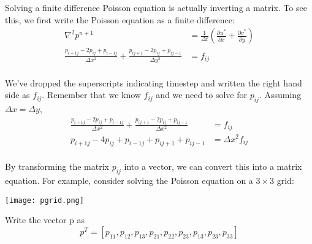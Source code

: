 \documentclass[12pt]{article}
\begin{document}
Solving a finite difference Poisson equation is actually inverting a matrix.  To see this, we first write the Poisson equation as a finite difference:
\begin{align*}
\nabla^2 p^{n+1} &= \frac{1}{\Delta t}\left( \frac{\partial u^*}{\partial x} + \frac{\partial v^*}{\partial y}\right) \\
\frac{p_{i+1j}-2p_{ij}+p_{i-1j}}{\Delta x^2} + \frac{p_{ij+1}-2p_{ij}+p_{ij-1}}{\Delta y^2} &= f_{ij}  \\
\end{align*}

We've dropped the superscripts indicating timestep and written the right hand side as $f_{ij}$.  Remember that we know $f_{ij}$ and we need to solve for $p_{ij}$.  Assuming $\Delta x = \Delta y$,
\begin{align*}
\frac{p_{i+1j}-2p_{ij}+p_{i-1j}}{\Delta x^2} + \frac{p_{ij+1}-2p_{ij}+p_{ij-1}}{\Delta x^2} &= f_{ij}  \\
p_{i+1j}-4p_{ij}+p_{i-1j}+ p_{ij+1}+p_{ij-1} &= \Delta x^2 f_{ij}  \\
\end{align*}

By transforming the matrix $p_{ij}$ into a vector, we can convert this into a matrix equation.  For example, consider solving the Poisson equation on a $3 \times 3$ grid:
\begin{center}
\texttt{[image: pgrid.png]} 
\end{center}

Write the vector p as
\[ p^{T} = [p_{11}, p_{12}, p_{13}, p_{21}, p_{22}, p_{23}, p_{13}, p_{23}, p_{33}]\]
\end{document}
